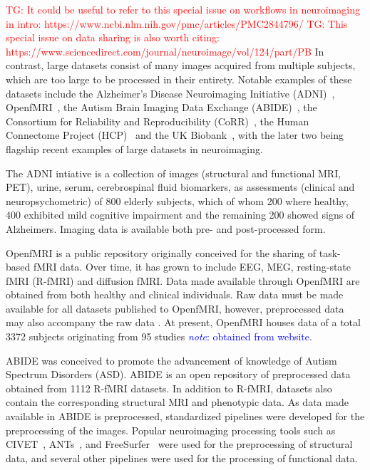 \documentclass{report}
\newcommand{\note}[1]{\textcolor{blue}{\textit{note}: #1}}
\newcommand{\tristan}[1]{\textcolor{red}{TG: #1}}
\begin{document}
            \tristan{It could be useful to refer to this special issue on workflows
            in neuroimaging in intro:
            https://www.ncbi.nlm.nih.gov/pmc/articles/PMC2844796/}
            \tristan{This special issue on data sharing is also worth citing:
            https://www.sciencedirect.com/journal/neuroimage/vol/124/part/PB}
            In contrast, large datasets consist of many images acquired from
            multiple subjects, which are too large to be processed in their
            entirety. Notable examples of these datasets include the 
            Alzheimer's Disease Neuroimaging Initiative 
            (ADNI)~\cite{doi:10.1002/jmri.21049}, 
            OpenfMRI~\cite{POLDRACK2017259}, 
            the Autism Brain Imaging Data Exchange 
            (ABIDE)~\cite{Di-Martino:2013aa}, the Consortium for
            Reliability and Reproducibility (CoRR)~\cite{Zuo:2014aa}, the Human 
            Connectome Project (HCP)~\cite{VANESSEN201362} and the UK 
            Biobank~\cite{Miller:2016aa}, with the later
            two being flagship recent examples of large datasets in 
            neuroimaging.

            The ADNI intiative is a collection of images (structural and 
            functional MRI, PET), urine,
            serum, cerebrospinal fluid biomarkers, as assessments (clinical and
            neuropsychometric) of 800 elderly subjects, which of whom 200 where
            healthy, 400 exhibited mild cognitive impairment and the remaining
            200 showed signs of Alzheimers. Imaging data is available both 
            pre- and post-processed form.

            OpenfMRI is a public repository originally conceived for the sharing
            of task-based fMRI data. Over time, it has grown to include EEG, MEG,
            resting-state fMRI (R-fMRI) and diffusion fMRI. Data made 
            available through
            OpenfMRI are obtained from both healthy and clinical individuals.
            Raw data must be made available for all datasets published to 
            OpenfMRI, however, preprocessed data may also accompany the raw data
            . At present, OpenfMRI houses data of a total 3372 subjects
            originating from 95 studies \note{obtained from website}.

            ABIDE was conceived to promote the advancement of knowledge 
            of Autism Spectrum Disorders (ASD). %
            ABIDE is an open repository of 
            preprocessed data obtained from 1112 R-fMRI datasets.
            In addition to R-fMRI, datasets also contain the corresponding 
            structural MRI and phenotypic data. As data made available in ABIDE
            is preprocessed, standardized pipelines were developed for the 
            preprocessing of the images. Popular neuroimaging processing tools
            such as CIVET~\cite{citation-0}, ANTs~\cite{avants2009advanced}, 
            and FreeSurfer~\cite{FISCHL2012774} were used for the 
            preprocessing of structural data, and several other pipelines were
            used for the processing of functional data.
\end{document}
